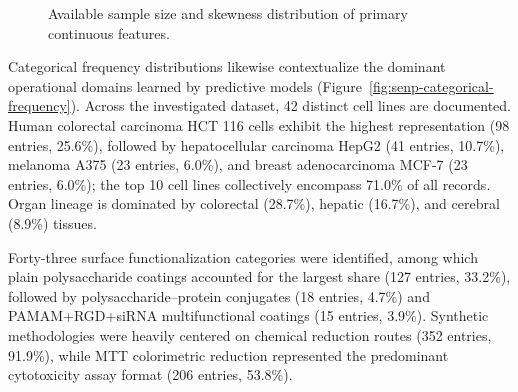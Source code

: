 \documentclass[letterpaper]{article}
\begin{document}
\begin{figure}[H]
  \begin{minipage}{0.62\linewidth}
    \centering
  \end{minipage}
  \caption{Available sample size and skewness distribution of primary continuous features.}
  \label{fig:senp-continuous-summary}
\end{figure}

Categorical frequency distributions likewise contextualize the dominant operational domains learned by predictive models (Figure~\ref{fig:senp-categorical-frequency}). Across the investigated dataset, 42 distinct cell lines are documented. Human colorectal carcinoma HCT 116 cells exhibit the highest representation (98 entries, 25.6\%), followed by hepatocellular carcinoma HepG2 (41 entries, 10.7\%), melanoma A375 (23 entries, 6.0\%), and breast adenocarcinoma MCF-7 (23 entries, 6.0\%); the top 10 cell lines collectively encompass 71.0\% of all records. Organ lineage is dominated by colorectal (28.7\%), hepatic (16.7\%), and cerebral (8.9\%) tissues.

Forty-three surface functionalization categories were identified, among which plain polysaccharide coatings accounted for the largest share (127 entries, 33.2\%), followed by polysaccharide--protein conjugates (18 entries, 4.7\%) and PAMAM+RGD+siRNA multifunctional coatings (15 entries, 3.9\%). Synthetic methodologies were heavily centered on chemical reduction routes (352 entries, 91.9\%), while MTT colorimetric reduction represented the predominant cytotoxicity assay format (206 entries, 53.8\%).
\end{document}
